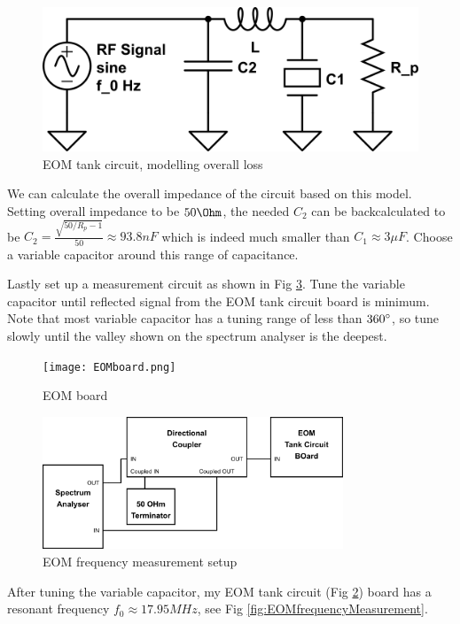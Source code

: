 \documentclass[12pt]{report}
\begin{document}
\begin{figure}[H]
    \centering
    \includegraphics[width=.8\textwidth]{eom-tank-cirucuit2.png}
    \caption{EOM tank circuit, modelling overall loss}
    \label{fig:eom-tank-cirucuit2}
\end{figure}

We can calculate the overall impedance of the circuit based on this model. Setting overall impedance to be $50\Ohm$, the needed $C_2$ can be backcalculated to be $C_2 = \frac{\sqrt{50/R_p -1}}{50} \approx 93.8 nF$ which is indeed much smaller than $C_1 \approx 3 \mu F$. Choose a variable capacitor around this range of capacitance. 
\par
Lastly set up a measurement circuit as shown in Fig \ref{fig:eom-freq-measurement-setup.png}. Tune the variable capacitor until reflected signal from the EOM tank circuit board is minimum. Note that most variable capacitor has a tuning range of less than $360\degree$, so tune slowly until the valley shown on the spectrum analyser is the deepest. 

\begin{figure}[H]
    \centering
    \texttt{[image: EOMboard.png]}
    \caption{EOM board}
    \label{fig:EOMboard}
\end{figure}

\begin{figure}[H]
    \centering
    \includegraphics[width=0.8\textwidth]{eom-freq-measurement-setup.png}
    \caption{EOM frequency measurement setup}
    \label{fig:eom-freq-measurement-setup.png}
\end{figure}

After tuning the variable capacitor, my EOM tank circuit (Fig \ref{fig:EOMboard}) board has a resonant frequency $f_0 \approx 17.95 MHz$, see Fig \ref{fig:EOMfrequencyMeasurement}. 
\end{document}
